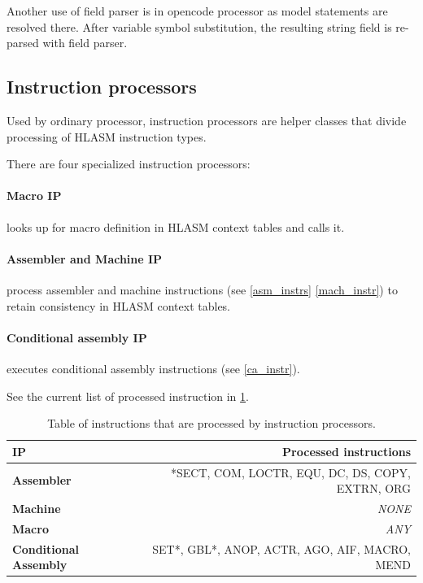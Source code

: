 Another use of field parser is in opencode processor as model statements are resolved there. After variable symbol substitution, the resulting string field is re-parsed with field parser.

\subsection{Instruction processors}

Used by ordinary processor, instruction processors are helper classes that divide processing of HLASM instruction types.

There are four specialized instruction processors:
\paragraph*{Macro IP} looks up for macro definition in HLASM context tables and calls it.
\paragraph*{Assembler and Machine IP} process assembler and machine instructions (see \cref{asm_instrs} \cref{mach_instr}) to retain consistency in HLASM context tables.

\paragraph*{Conditional assembly IP} executes conditional assembly instructions (see \cref{ca_instr}). 

\vspace{5mm}

See the current list of processed instruction in \cref{tab06:instr_proc}.

\begin{table}
	\centering
	\begin{tabular}{lr}
		\textbf{IP}                   &                  \textbf{Processed instructions} \\ \toprule
		\textbf{Assembler}            & *SECT, COM, LOCTR, EQU, DC, DS, COPY, EXTRN, ORG \\
		\textbf{Machine}              &                                      \emph{NONE} \\
		\textbf{Macro}                &                                       \emph{ANY} \\
		\textbf{Conditional Assembly} &    SET*, GBL*, ANOP, ACTR, AGO, AIF, MACRO, MEND \\ \bottomrule
	\end{tabular}
	\caption{Table of instructions that are processed by instruction processors.}
	\label{tab06:instr_proc}
\end{table}

